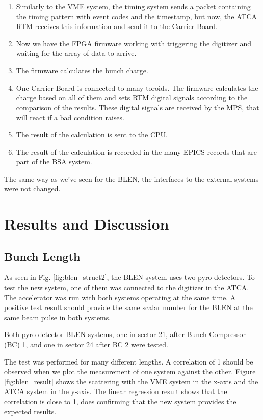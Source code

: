 \documentclass[letter,
        biblatex,   %
        keeplastbox,  %
        ]{jacow}
\begin{document}
\begin{enumerate}
  \item Similarly to the VME system, the timing system sends a packet containing the timing pattern with event codes and the timestamp, but now, the ATCA RTM receives this information and send it to the Carrier Board.
  \item Now we have the FPGA firmware working with triggering the digitizer and waiting for the array of data to arrive.
  \item The firmware calculates the bunch charge.
  \item One Carrier Board is connected to many toroids. The firmware calculates the charge based on all of them and sets RTM digital signals according to the comparison of the results. These digital signals are received by the MPS, that will react if a bad condition raises.
  \item The result of the calculation is sent to the CPU.
  \item The result of the calculation is recorded in the many EPICS records that are part of the BSA system.
\end{enumerate}

The same way as we've seen for the BLEN, the interfaces to the external systems were not changed.

\section{Results and Discussion}
\subsection{Bunch Length}
As seen in Fig. \ref{fig:blen_struct2}, the BLEN system uses two pyro detectors. To test the new system, one of them was connected to the digitizer in the ATCA. The accelerator was run with both systems operating at the same time. A positive test result should provide the same scalar number for the BLEN at the same beam pulse in both systems.

Both pyro detector BLEN systems, one in sector 21, after Bunch Compressor (BC) 1, and one in sector 24 after BC 2 were tested.

The test was performed for many different lengths. A correlation of 1 should be observed when we plot the measurement of one system against the other. Figure \ref{fig:blen_result} shows the scattering with the VME system in the x-axis and the ATCA system in the y-axis. The linear regression result shows that the correlation is close to 1, does confirming that the new system provides the expected results.
\end{document}
